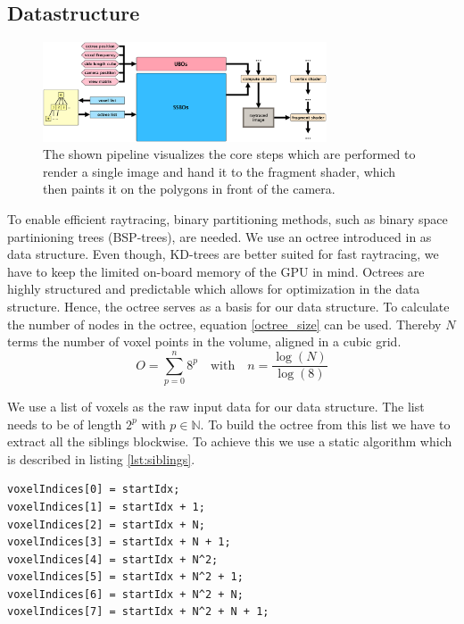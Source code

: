 \documentclass[12pt,conference]{IEEEtran}
\begin{document}
\subsection{Datastructure}
\begin{figure}[htp]
	\centering
	\includegraphics[width=0.75\textwidth]{images/rendering_process.png}
	\caption{The shown pipeline visualizes the core steps which are performed to render a single image and hand it to the fragment shader, which then paints it on the polygons in front of the camera.}
	\label{fig:renderingprocess}
\end{figure}
To enable efficient raytracing, binary partitioning methods, such as binary space partinioning trees (BSP-trees), are needed. We use an octree introduced in \cite{meagher1982geometric} as data structure. Even though, KD-trees are better suited for fast raytracing\cite{havran2000heuristic}, we have to keep the limited on-board memory of the GPU in mind. Octrees are highly structured and predictable which allows for optimization in the data structure\cite{crassin2009gigavoxels}.
Hence, the octree serves as a basis for our data structure. To calculate the number of nodes in the octree, equation \ref{octree_size} can be used. Thereby $N$ terms the number of voxel points in the volume, aligned in a cubic grid.
\begin{equation} 
O = \sum\limits_{p=0}^{n} 8^{p} \quad \textrm{with} \quad n = \frac{\log(N)}{\log(8)}
\label{octree_size} 
\end{equation}

We use a list of voxels as the raw input data for our data structure. The list needs to be of length $2^p$ with $p \in \mathbb{N}$. To build the octree from this list we have to extract all the siblings blockwise. To achieve this we use a static algorithm which is described in listing \ref{lst:siblings}.

\begin{lstlisting}[label=lst:siblings, caption={To find the siblings of a given voxel inside the input list we use this static algorithm. Aside from the index of the first voxel we also need the side length of the cubic volume, labeled as $N$ in the above listing.}]
voxelIndices[0] = startIdx;
voxelIndices[1] = startIdx + 1;
voxelIndices[2] = startIdx + N;
voxelIndices[3] = startIdx + N + 1;
voxelIndices[4] = startIdx + N^2;
voxelIndices[5] = startIdx + N^2 + 1;
voxelIndices[6] = startIdx + N^2 + N;
voxelIndices[7] = startIdx + N^2 + N + 1;
\end{lstlisting}
\end{document}
